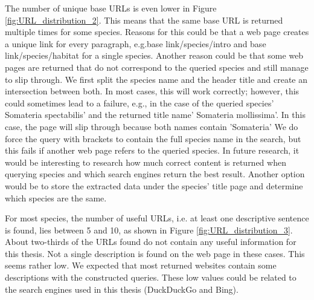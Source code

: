 \documentclass[a4paper, 12pt, oneside]{book} %
\begin{document}
The number of unique base URLs is even lower in Figure \ref{fig:URL_distribution_2}.
This means that the same base URL is returned multiple times for some species. 
Reasons for this could be that a web page creates a unique link for every paragraph, e.g.base link/species/intro and base link/species/habitat for a single species.
Another reason could be that some web pages are returned that do not correspond to the queried species and still manage to slip through.
We first split the species name and the header title and create an intersection between both.
In most cases, this will work correctly; however, this could sometimes lead to a failure, e.g., in the case of the queried species' Somateria spectabilis' and the returned title name' Somateria mollissima'.
In this case, the page will slip through because both names contain 'Somateria'
We do force the query with brackets to contain the full species name in the search, but this fails if another web page refers to the queried species.
In future research, it would be interesting to research how much correct content is returned when querying species and which search engines return the best result. 
Another option would be to store the extracted data under the species' title page and determine which species are the same. 

For most species, the number of useful URLs, i.e. at least one descriptive sentence is found, lies between 5 and 10, as shown in Figure \ref{fig:URL_distribution_3}.
About two-thirds of the URLs found do not contain any useful information for this thesis.
Not a single description is found on the web page in these cases.
This seems rather low.
We expected that most returned websites contain some descriptions with the constructed queries. 
These low values could be related to the search engines used in this thesis (DuckDuckGo and Bing).

\end{document}
